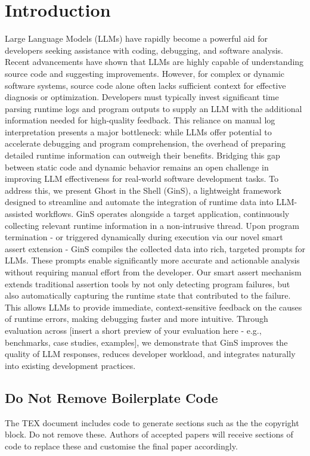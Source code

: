 \documentclass[sigconf]{acmart}
\begin{document}
\section{Introduction}
Large Language Models (LLMs) have rapidly become a powerful aid for developers seeking assistance with coding, debugging, and software analysis. 
Recent advancements have shown that LLMs are highly capable of understanding source code and suggesting improvements. 
However, for complex or dynamic software systems, source code alone often lacks sufficient context for effective diagnosis or optimization. 
Developers must typically invest significant time parsing runtime logs and program outputs to supply an LLM with the additional information needed for high-quality feedback.
This reliance on manual log interpretation presents a major bottleneck: while LLMs offer potential to accelerate debugging and program comprehension, the overhead of preparing detailed runtime information can outweigh their benefits. 
Bridging this gap between static code and dynamic behavior remains an open challenge in improving LLM effectiveness for real-world software development tasks.
To address this, we present Ghost in the Shell (GinS), a lightweight framework designed to streamline and automate the integration of runtime data into LLM-assisted workflows. 
GinS operates alongside a target application, continuously collecting relevant runtime information in a non-intrusive thread. 
Upon program termination - or triggered dynamically during execution via our novel smart assert extension - GinS compiles the collected data into rich, targeted prompts for LLMs. 
These prompts enable significantly more accurate and actionable analysis without requiring manual effort from the developer.
Our smart assert mechanism extends traditional assertion tools by not only detecting program failures, but also automatically capturing the runtime state that contributed to the failure. This allows LLMs to provide immediate, context-sensitive feedback on the causes of runtime errors, making debugging faster and more intuitive.
Through evaluation across [insert a short preview of your evaluation here - e.g., benchmarks, case studies, examples], we demonstrate that GinS improves the quality of LLM responses, reduces developer workload, and integrates naturally into existing development practices.

\subsection{Do Not Remove Boilerplate Code}
The TEX document includes code to generate sections such as the the copyright block. Do not remove these. Authors of accepted papers will receive sections of code to replace these and customise the final paper accordingly.
\end{document}
